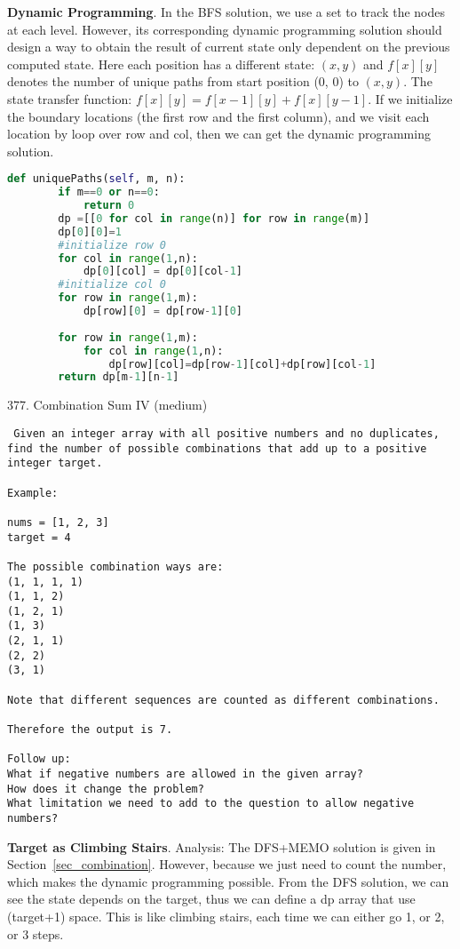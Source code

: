 \documentclass[../main.tex]{subfiles}
\begin{document}
\textbf{Dynamic Programming}. In the BFS solution, we use a set to track  the nodes at each level. However, its corresponding dynamic programming solution should design a way to obtain the result of current state only dependent on the previous computed state. Here each position has a different state:  $(x, y)$ and $f[x][y]$ denotes the number of unique paths from start position (0, 0) to $(x, y)$. The state transfer function: $f[x][y] = f[x-1][y] + f[x][y -1]$. If we initialize the boundary locations (the first row and the first column), and we visit each location by loop over row and col, then we can get the dynamic programming solution. 

\begin{lstlisting}[language = Python]
def uniquePaths(self, m, n):
        if m==0 or n==0:
            return 0
        dp =[[0 for col in range(n)] for row in range(m)]
        dp[0][0]=1
        #initialize row 0
        for col in range(1,n):
            dp[0][col] = dp[0][col-1]
        #initialize col 0
        for row in range(1,m):
            dp[row][0] = dp[row-1][0]
        
        for row in range(1,m):
            for col in range(1,n):
                dp[row][col]=dp[row-1][col]+dp[row][col-1]
        return dp[m-1][n-1]
\end{lstlisting}
377. Combination Sum IV (medium)
\begin{lstlisting}
 Given an integer array with all positive numbers and no duplicates, find the number of possible combinations that add up to a positive integer target.

Example:

nums = [1, 2, 3]
target = 4

The possible combination ways are:
(1, 1, 1, 1)
(1, 1, 2)
(1, 2, 1)
(1, 3)
(2, 1, 1)
(2, 2)
(3, 1)

Note that different sequences are counted as different combinations.

Therefore the output is 7.

Follow up:
What if negative numbers are allowed in the given array?
How does it change the problem?
What limitation we need to add to the question to allow negative numbers? 
\end{lstlisting}
\textbf{Target as Climbing Stairs}. Analysis: The DFS+MEMO solution is given in Section~\ref{sec_combination}. However, because we just need to count the number, which makes the dynamic programming possible. From the DFS solution, we can see the state depends on the target, thus we can define a dp array that use (target+1) space. This is like climbing stairs, each time we can either go 1, or 2, or 3 steps. 
\end{document}
